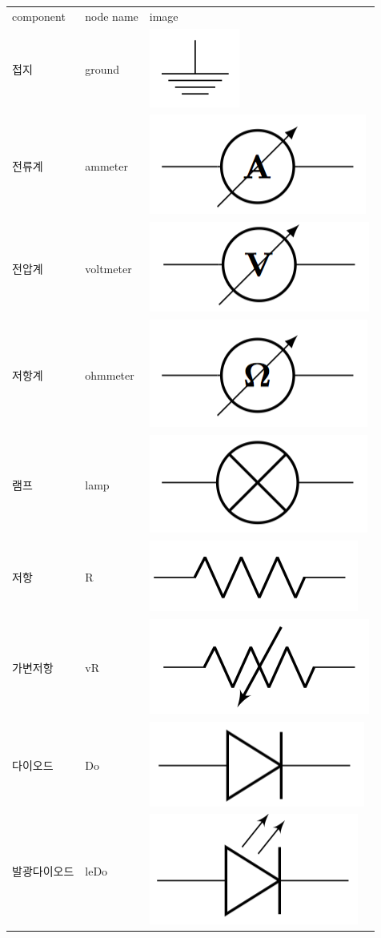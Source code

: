 \documentclass[12pt]{book}
\begin{document}
	\begin{table}[]
		\begin{tabular}{lll}
			component  & node name               & image \\
			접지         & ground                  & \includegraphics[height=0.045\linewidth]{./images/circuitikz_1.png}       \\
			전류계        & ammeter                 & \includegraphics[height=0.045\linewidth]{./images/circuitikz_2.png}       \\
			전압계        & voltmeter               & \includegraphics[height=0.045\linewidth]{./images/circuitikz_3.png}        \\
			저항계        & ohmmeter                & \includegraphics[height=0.045\linewidth]{./images/circuitikz_4.png}       \\
			램프         & lamp                    & \includegraphics[height=0.045\linewidth]{./images/circuitikz_5.png}        \\
			저항         & R                       & \includegraphics[height=0.045\linewidth]{./images/circuitikz_6.png}        \\
			가변저항       & vR                      & \includegraphics[height=0.045\linewidth]{./images/circuitikz_7.png}       \\
			다이오드       & Do                      & \includegraphics[height=0.045\linewidth]{./images/circuitikz_8.png}       \\
			발광다이오드     & leDo                    & \includegraphics[height=0.045\linewidth]{./images/circuitikz_9.png}       \\

\end{tabular}
\end{table}
\end{document}
